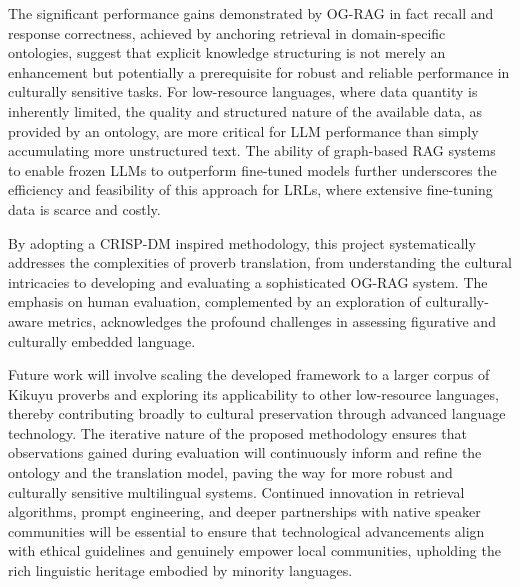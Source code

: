 \documentclass[12pt]{article}
\begin{document}
The significant performance gains demonstrated by OG-RAG in fact recall and response correctness, achieved by anchoring retrieval in domain-specific ontologies, suggest that explicit knowledge structuring is not merely an enhancement but potentially a prerequisite for robust and reliable performance in culturally sensitive tasks. For low-resource languages, where data quantity is inherently limited, the quality and structured nature of the available data, as provided by an ontology, are more critical for LLM performance than simply accumulating more unstructured text. The ability of graph-based RAG systems to enable frozen LLMs to outperform fine-tuned models further underscores the efficiency and feasibility of this approach for LRLs, where extensive fine-tuning data is scarce and costly.

By adopting a CRISP-DM inspired methodology, this project systematically addresses the complexities of proverb translation, from understanding the cultural intricacies to developing and evaluating a sophisticated OG-RAG system. The emphasis on human evaluation, complemented by an exploration of culturally-aware metrics, acknowledges the profound challenges in assessing figurative and culturally embedded language.

Future work will involve scaling the developed framework to a larger corpus of Kikuyu proverbs and exploring its applicability to other low-resource languages, thereby contributing broadly to cultural preservation through advanced language technology. The iterative nature of the proposed methodology ensures that observations gained during evaluation will continuously inform and refine the ontology and the translation model, paving the way for more robust and culturally sensitive multilingual systems. Continued innovation in retrieval algorithms, prompt engineering, and deeper partnerships with native speaker communities will be essential to ensure that technological advancements align with ethical guidelines and genuinely empower local communities, upholding the rich linguistic heritage embodied by minority languages.

\printbibliography
\end{document}
